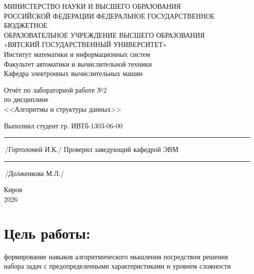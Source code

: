 \documentclass[oneside,a4paper,14pt]{extarticle} %
\begin{document}
	\newpage\thispagestyle{empty}
	\begin{center}
		МИНИСТЕРСТВО НАУКИ И ВЫСШЕГО ОБРАЗОВАНИЯ\\
			РОССИЙСКОЙ ФЕДЕРАЦИИ
			ФЕДЕРАЛЬНОЕ ГОСУДАРСТВЕННОЕ БЮДЖЕТНОЕ\\
			ОБРАЗОВАТЕЛЬНОЕ
			УЧРЕЖДЕНИЕ ВЫСШЕГО ОБРАЗОВАНИЯ\\
			«ВЯТСКИЙ ГОСУДАРСТВЕННЫЙ УНИВЕРСИТЕТ»\\
			Институт математики и информационных систем\\
			Факультет автоматики и вычислительной техники\\
			Кафедра электронных вычислительных машин
	\end{center}
	\vspace{20mm}

	\begin{center}
		Отчёт по лабораторной работе №2\\
		по дисциплине\\
		<<Алгоритмы и структуры данных>>\\
	\end{center}
	\vspace{48mm}

	\noindent
	Выполнил студент гр. ИВТб-1303-06-00 \hfill \rule[-0,5mm]{30mm}{0.15mm}\,/Гортоломей И.К./
	\newline
	Проверил заведующий кафедрой ЭВМ \hfill \rule[-0,5mm]{30mm}{0.15mm}\,/Долженкова М.Л./

	\vfill
	\begin{center}
		Киров\\
		2026
	\end{center}

	\newpage
	\thispagestyle{empty}

	\section*{Цель работы:}
	формирование навыков алгоритмического мышления посредством решения набора
	задач с предопределенными характеристиками и уровнем сложности
\end{document}
